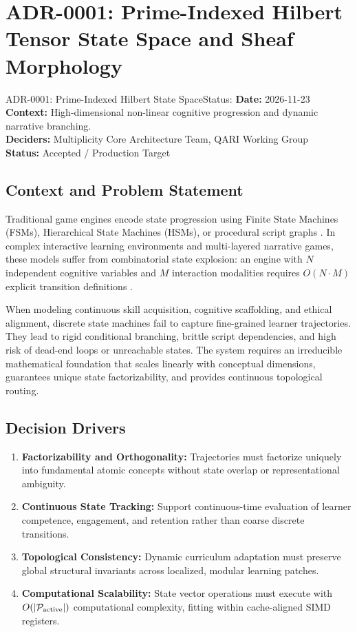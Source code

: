 \section{ADR-0001: Prime-Indexed Hilbert Tensor State Space and Sheaf Morphology}
\label{sec:adr0001}

\begin{adrbox}{ADR-0001: Prime-Indexed Hilbert State Space}{Status: }
\textbf{Date:} 2026-11-23 \\
\textbf{Context:} High-dimensional non-linear cognitive progression and dynamic narrative branching. \\
\textbf{Deciders:} Multiplicity Core Architecture Team, QARI Working Group \\
\textbf{Status:} Accepted / Production Target
\end{adrbox}

\subsection{Context and Problem Statement}
Traditional game engines encode state progression using Finite State Machines (FSMs), Hierarchical State Machines (HSMs), or procedural script graphs \cite{gregory2018game, nystrom2014game}. In complex interactive learning environments and multi-layered narrative games, these models suffer from combinatorial state explosion: an engine with $N$ independent cognitive variables and $M$ interaction modalities requires $O(N \cdot M)$ explicit transition definitions \cite{nystrom2014game}. 

When modeling continuous skill acquisition, cognitive scaffolding, and ethical alignment, discrete state machines fail to capture fine-grained learner trajectories. They lead to rigid conditional branching, brittle script dependencies, and high risk of dead-end loops or unreachable states. The system requires an irreducible mathematical foundation that scales linearly with conceptual dimensions, guarantees unique state factorizability, and provides continuous topological routing.

\subsection{Decision Drivers}
\begin{enumerate}[label=\bfseries D\arabic*.]
    \item \textbf{Factorizability and Orthogonality:} Trajectories must factorize uniquely into fundamental atomic concepts without state overlap or representational ambiguity.
    \item \textbf{Continuous State Tracking:} Support continuous-time evaluation of learner competence, engagement, and retention rather than coarse discrete transitions.
    \item \textbf{Topological Consistency:} Dynamic curriculum adaptation must preserve global structural invariants across localized, modular learning patches.
    \item \textbf{Computational Scalability:} State vector operations must execute with $O(|\mathcal{P}_{\text{active}}|)$ computational complexity, fitting within cache-aligned SIMD registers.
\end{enumerate}

